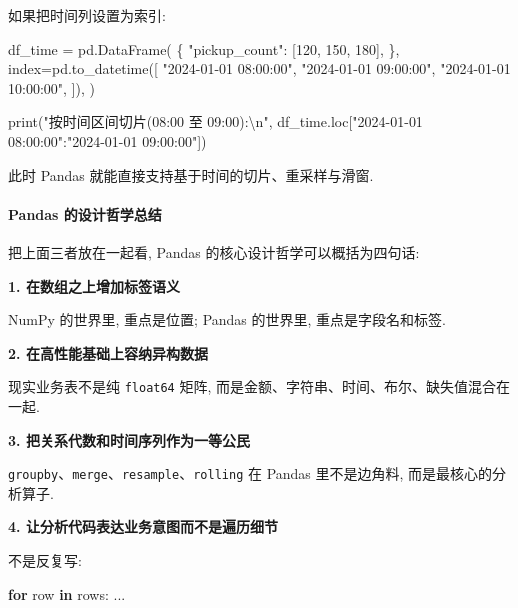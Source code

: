 \documentclass[11pt]{article}
\newenvironment{Shaded}{}{}
\newcommand{\KeywordTok}[1]{\textcolor[rgb]{0.00,0.44,0.13}{\textbf{{#1}}}}
\newcommand{\DecValTok}[1]{\textcolor[rgb]{0.25,0.63,0.44}{{#1}}}
\newcommand{\CharTok}[1]{\textcolor[rgb]{0.25,0.44,0.63}{{#1}}}
\newcommand{\StringTok}[1]{\textcolor[rgb]{0.25,0.44,0.63}{{#1}}}
\newcommand{\NormalTok}[1]{{#1}}
\newcommand{\ControlFlowTok}[1]{\textcolor[rgb]{0.00,0.44,0.13}{\textbf{{#1}}}}
\newcommand{\OperatorTok}[1]{\textcolor[rgb]{0.40,0.40,0.40}{{#1}}}
\newcommand{\BuiltInTok}[1]{{#1}}
\begin{document}
如果把时间列设置为索引:

\begin{Shaded}
\begin{Highlighting}[]
\NormalTok{df\_time }\OperatorTok{=}\NormalTok{ pd.DataFrame(}
\NormalTok{    \{}
        \StringTok{"pickup\_count"}\NormalTok{: [}\DecValTok{120}\NormalTok{, }\DecValTok{150}\NormalTok{, }\DecValTok{180}\NormalTok{],}
\NormalTok{    \},}
\NormalTok{    index}\OperatorTok{=}\NormalTok{pd.to\_datetime([}
        \StringTok{"2024{-}01{-}01 08:00:00"}\NormalTok{,}
        \StringTok{"2024{-}01{-}01 09:00:00"}\NormalTok{,}
        \StringTok{"2024{-}01{-}01 10:00:00"}\NormalTok{,}
\NormalTok{    ]),}
\NormalTok{)}

\BuiltInTok{print}\NormalTok{(}\StringTok{"按时间区间切片(08:00 至 09:00):}\CharTok{\textbackslash{}n}\StringTok{"}\NormalTok{, df\_time.loc[}\StringTok{"2024{-}01{-}01 08:00:00"}\NormalTok{:}\StringTok{"2024{-}01{-}01 09:00:00"}\NormalTok{])}
\end{Highlighting}
\end{Shaded}

此时 Pandas 就能直接支持基于时间的切片、重采样与滑窗.

    \paragraph{Pandas
的设计哲学总结}\label{pandas-ux7684ux8bbeux8ba1ux54f2ux5b66ux603bux7ed3}

    把上面三者放在一起看, Pandas 的核心设计哲学可以概括为四句话:

\textbf{1. 在数组之上增加标签语义}

NumPy 的世界里, 重点是位置; Pandas 的世界里, 重点是字段名和标签.

\textbf{2. 在高性能基础上容纳异构数据}

现实业务表不是纯 \texttt{float64} 矩阵,
而是金额、字符串、时间、布尔、缺失值混合在一起.

\textbf{3. 把关系代数和时间序列作为一等公民}

\texttt{groupby}、\texttt{merge}、\texttt{resample}、\texttt{rolling} 在
Pandas 里不是边角料, 而是最核心的分析算子.

\textbf{4. 让分析代码表达业务意图而不是遍历细节}

不是反复写:

\begin{Shaded}
\begin{Highlighting}[]
\ControlFlowTok{for}\NormalTok{ row }\KeywordTok{in}\NormalTok{ rows:}
\NormalTok{    ...}
\end{Highlighting}
\end{Shaded}
\end{document}
